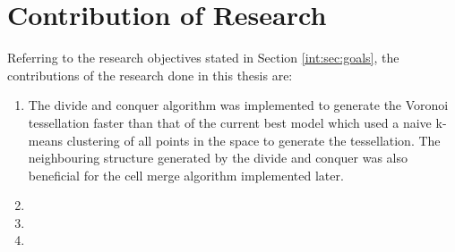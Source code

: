 \section{Contribution of Research}
Referring to the research objectives stated in Section \ref{int:sec:goals}, the contributions of the research done in this thesis are:
\begin{enumerate}
\item The divide and conquer algorithm was implemented to generate the Voronoi tessellation faster than that of the current best model which used a naive k-means clustering of all points in the space to generate the tessellation. The neighbouring structure generated by the divide and conquer was also beneficial for the cell merge algorithm implemented later.
\item 
\item 
\item 
\end{enumerate}
